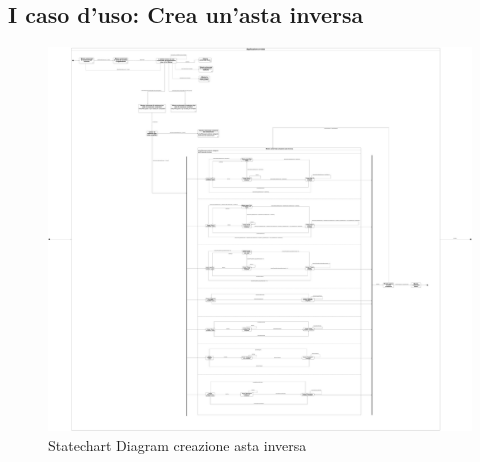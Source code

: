         \subsection{I caso d'uso: Crea un’asta inversa}
            \begin{figure}[htbp!]
            \centering
                \includegraphics[width=1\linewidth]{Immagini/Diagrammi/Statechart Diagram/CreaAstaInversa.pdf}
            \caption{Statechart Diagram creazione asta inversa}
            \end{figure}

        \clearpage

